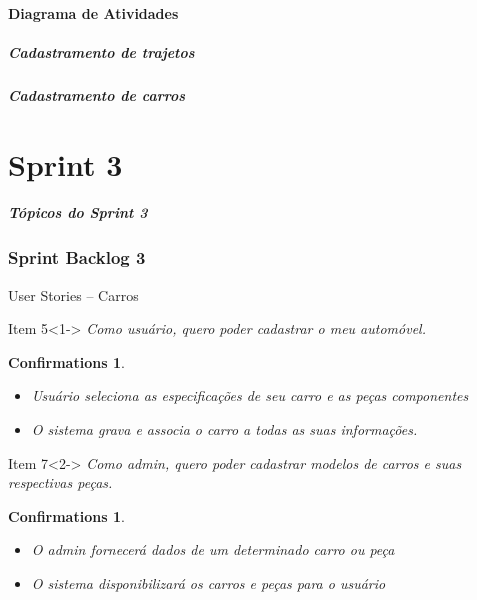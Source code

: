 \documentclass[hyperref={pdfpagelabels=false},11pt]{beamer}
\newtheorem{confirmations}[theorem]{Confirmations}
\begin{document}
			\subsection{Diagrama de Atividades}
				\begin{frame}
					\frametitle{Cadastramento de trajetos}
				\end{frame}	
				
				\pgfdeclareimage[interpolate=true,height=7cm]{seq22}{seq2-2}
				\begin{frame}
					\frametitle{Cadastramento de carros}
					\pgfuseimage{seq22}
				\end{frame}
	\part{Sprint 3}
	
		\begin{frame}
			\frametitle{Tópicos do Sprint 3}
			\tableofcontents[pausesections]
		\end{frame}	
	
		\section{Sprint Backlog 3}
			\begin{frame}{User Stories -- Carros}
				\begin{block}{Item 5}<1->
					\emph{Como usuário, quero poder cadastrar o meu automóvel.}
					\begin{confirmations}
						\begin{itemize}
							\tiny\item{Usuário seleciona as especificações de seu carro e as peças componentes}
							\tiny\item{O sistema grava e associa o carro a todas as suas informações.}
						\end{itemize}
					\end{confirmations}
				\end{block}
				
				\begin{block}{Item 7}<2->
					\emph{Como admin, quero poder cadastrar modelos de carros e suas respectivas peças.}
					\begin{confirmations}
						\begin{itemize}
							\tiny\item{O admin fornecerá dados de um determinado carro ou peça}
							\tiny\item{O sistema disponibilizará os carros e peças para o usuário}
						\end{itemize}
					\end{confirmations}
				\end{block}
			\end{frame}
			
\end{document}
